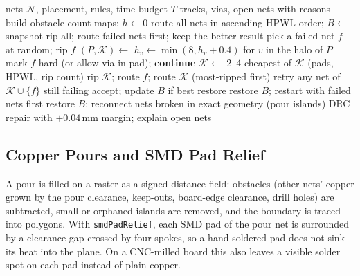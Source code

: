\documentclass[journal]{IEEEtran}
\begin{document}
\begin{algorithm}[t]
\caption{Negotiated rip-up and reroute with blocker discovery}
\label{alg:route}
\small
\begin{algorithmic}[1]
\Require nets $\mathcal{N}$, placement, rules, time budget $T$
\Ensure tracks, vias, open nets with reasons
\State build obstacle-count maps; $h \gets 0$
\State route all nets in ascending HPWL order; $B \gets$ snapshot
 rip all; route failed nets first; keep the better result \EndIf
{}
  \State pick a failed net $f$ at random; rip $f$
  \State $(P,\mathcal{K}) \gets$  
  \State $h_v \gets \min(8, h_v + 0.4)$ for $v$ in the halo of $P$
   mark $f$ hard (or allow via-in-pad); \textbf{continue} \EndIf
  \State $\mathcal{K} \gets$ 2--4 cheapest of $\mathcal{K}$ (pads, HPWL, rip count)
  \State rip $\mathcal{K}$; route $f$; route $\mathcal{K}$ (most-ripped first)
  \State retry any net of $\mathcal{K}\cup\{f\}$ still failing
   accept; update $B$ if best
  \Else{} restore \EndIf
   restore $B$; restart with failed nets first \EndIf
\EndWhile
\State restore $B$; reconnect nets broken in exact geometry (pour islands)
\State DRC repair with $+0.04$\,mm margin; explain open nets
\end{algorithmic}
\end{algorithm}

\subsection{Copper Pours and SMD Pad Relief}
A pour is filled on a raster as a signed distance field: obstacles (other nets' copper grown by the pour clearance, keep-outs, board-edge clearance, drill holes) are subtracted, small or orphaned islands are removed, and the boundary is traced into polygons. With \texttt{smdPadRelief}, each SMD pad of the pour net is surrounded by a clearance gap crossed by four spokes, so a hand-soldered pad does not sink its heat into the plane. On a CNC-milled board this also leaves a visible solder spot on each pad instead of plain copper.
\end{document}
